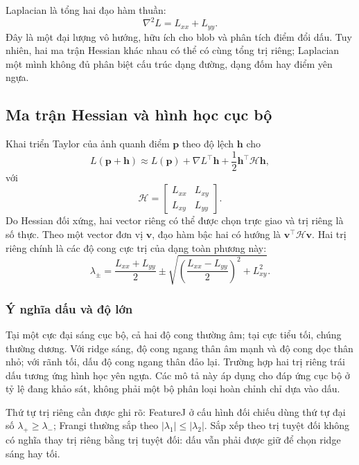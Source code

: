 Laplacian là tổng hai đạo hàm thuần:
\begin{equation}
\nabla^2L=L_{xx}+L_{yy}.
\end{equation}
Đây là một đại lượng vô hướng, hữu ích cho blob và phân tích điểm đổi dấu. Tuy nhiên, hai ma trận Hessian khác nhau có thể có cùng tổng trị riêng; Laplacian một mình không đủ phân biệt cấu trúc dạng đường, dạng đốm hay điểm yên ngựa.

\subsection{Ma trận Hessian và hình học cục bộ}
Khai triển Taylor của ảnh quanh điểm $\mathbf p$ theo độ lệch $\mathbf h$ cho
\begin{equation}
L(\mathbf p+\mathbf h)\approx
L(\mathbf p)+\nabla L^\top\mathbf h+
\frac12\mathbf h^\top\mathcal H\mathbf h,
\end{equation}
với
\begin{equation}
\mathcal H=
\begin{bmatrix}L_{xx}&L_{xy}\\L_{xy}&L_{yy}\end{bmatrix}.
\end{equation}
Do Hessian đối xứng, hai vector riêng có thể được chọn trực giao và trị riêng là số thực. Theo một vector đơn vị $\mathbf v$, đạo hàm bậc hai có hướng là $\mathbf v^\top\mathcal H\mathbf v$. Hai trị riêng chính là các độ cong cực trị của dạng toàn phương này:
\begin{equation}
\lambda_\pm=\frac{L_{xx}+L_{yy}}2
\pm\sqrt{\left(\frac{L_{xx}-L_{yy}}2\right)^2+L_{xy}^2}.
\end{equation}

\subsubsection{Ý nghĩa dấu và độ lớn}
Tại một cực đại sáng cục bộ, cả hai độ cong thường âm; tại cực tiểu tối, chúng thường dương. Với ridge sáng, độ cong ngang thân âm mạnh và độ cong dọc thân nhỏ; với rãnh tối, dấu độ cong ngang thân đảo lại. Trường hợp hai trị riêng trái dấu tương ứng hình học yên ngựa. Các mô tả này áp dụng cho đáp ứng cục bộ ở tỷ lệ đang khảo sát, không phải một bộ phân loại hoàn chỉnh chỉ dựa vào dấu.

Thứ tự trị riêng cần được ghi rõ: FeatureJ ở cấu hình đối chiếu dùng thứ tự đại số $\lambda_+\geq\lambda_-$; Frangi thường sắp theo $|\lambda_1|\leq|\lambda_2|$. Sắp xếp theo trị tuyệt đối không có nghĩa thay trị riêng bằng trị tuyệt đối: dấu vẫn phải được giữ để chọn ridge sáng hay tối.

